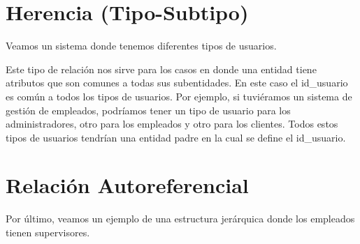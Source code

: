 \documentclass[12pt]{article}
\begin{document}
\section{Herencia (Tipo-Subtipo)}
Veamos un sistema donde tenemos diferentes tipos de usuarios.

\begin{center}
\end{center}

Este tipo de relación nos sirve para los casos en donde una entidad tiene atributos que son comunes a todas sus subentidades. En este caso el id\_usuario es común a todos los tipos de usuarios. Por ejemplo, si tuviéramos un sistema de gestión de empleados, podríamos tener un tipo de usuario para los administradores, otro para los empleados y otro para los clientes. Todos estos tipos de usuarios tendrían una entidad padre en la cual se define el id\_usuario.

\section{Relación Autoreferencial}
Por último, veamos un ejemplo de una estructura jerárquica donde los empleados tienen supervisores.
\end{document}
